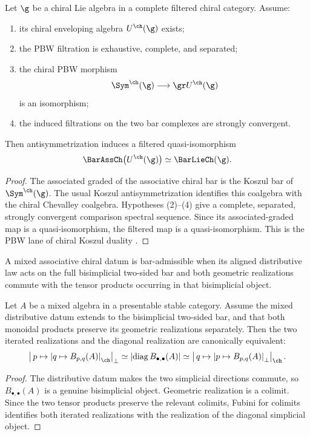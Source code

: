 \begin{theorem}
Let $\g$ be a chiral Lie algebra in a complete filtered chiral category.  Assume:
\begin{enumerate}
\item its chiral enveloping algebra $U^{\ch}(\g)$ exists;
\item the PBW filtration is exhaustive, complete, and separated;
\item the chiral PBW morphism
\[
 \Sym^{\ch}(\g)\longrightarrow \gr U^{\ch}(\g)
\]
is an isomorphism;
\item the induced filtrations on the two bar complexes are strongly convergent.
\end{enumerate}
Then antisymmetrization induces a filtered quasi-isomorphism
\[
 \BarAssCh\bigl(U^{\ch}(\g)\bigr)
 \simeq
 \BarLieCh(\g).
\]
\end{theorem}
\begin{proof}
The associated graded of the associative chiral bar is the Koszul bar of $\Sym^{\ch}(\g)$.  The usual Koszul antisymmetrization identifies this coalgebra with the chiral Chevalley coalgebra.  Hypotheses (2)--(4) give a complete, separated, strongly convergent comparison spectral sequence.  Since its associated-graded map is a quasi-isomorphism, the filtered map is a quasi-isomorphism.  This is the PBW lane of chiral Koszul duality \cite{BD04,FG12}.
\end{proof}

\begin{definition}
A mixed associative chiral datum is bar-admissible when its aligned distributive law acts on the full bisimplicial two-sided bar and both geometric realizations commute with the tensor products occurring in that bisimplicial object.
\end{definition}

\begin{theorem}
Let $A$ be a mixed algebra in a presentable stable category.  Assume the mixed distributive datum extends to the bisimplicial two-sided bar, and that both monoidal products preserve its geometric realizations separately.  Then the two iterated realizations and the diagonal realization are canonically equivalent:
\[
 \left|\,p\mapsto\left|q\mapsto B_{p,q}(A)\right|_{\ch}\right|_\perp
 \simeq
 \left|\operatorname{diag}B_{\bullet,\bullet}(A)\right|
 \simeq
 \left|\,q\mapsto\left|p\mapsto B_{p,q}(A)\right|_\perp\right|_{\ch}.
\]
\end{theorem}
\begin{proof}
The distributive datum makes the two simplicial directions commute, so $B_{\bullet,\bullet}(A)$ is a genuine bisimplicial object.  Geometric realization is a colimit.  Since the two tensor products preserve the relevant colimits, Fubini for colimits identifies both iterated realizations with the realization of the diagonal simplicial object.
\end{proof}

